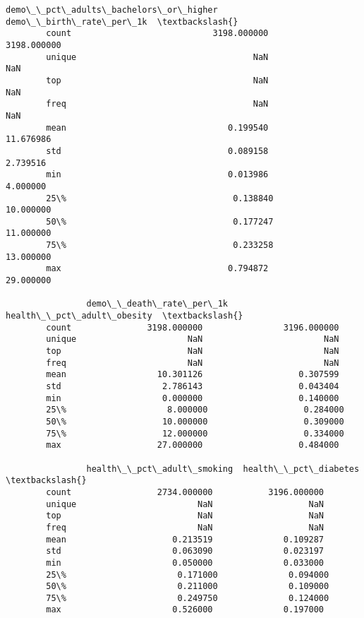 \documentclass[11pt]{article}
\begin{document}
\begin{Verbatim}[commandchars=\\\{\}]
                demo\_\_pct\_adults\_bachelors\_or\_higher  demo\_\_birth\_rate\_per\_1k  \textbackslash{}
        count                            3198.000000              3198.000000   
        unique                                   NaN                      NaN   
        top                                      NaN                      NaN   
        freq                                     NaN                      NaN   
        mean                                0.199540                11.676986   
        std                                 0.089158                 2.739516   
        min                                 0.013986                 4.000000   
        25\%                                 0.138840                10.000000   
        50\%                                 0.177247                11.000000   
        75\%                                 0.233258                13.000000   
        max                                 0.794872                29.000000   
        
                demo\_\_death\_rate\_per\_1k  health\_\_pct\_adult\_obesity  \textbackslash{}
        count               3198.000000                3196.000000   
        unique                      NaN                        NaN   
        top                         NaN                        NaN   
        freq                        NaN                        NaN   
        mean                  10.301126                   0.307599   
        std                    2.786143                   0.043404   
        min                    0.000000                   0.140000   
        25\%                    8.000000                   0.284000   
        50\%                   10.000000                   0.309000   
        75\%                   12.000000                   0.334000   
        max                   27.000000                   0.484000   
        
                health\_\_pct\_adult\_smoking  health\_\_pct\_diabetes  \textbackslash{}
        count                 2734.000000           3196.000000   
        unique                        NaN                   NaN   
        top                           NaN                   NaN   
        freq                          NaN                   NaN   
        mean                     0.213519              0.109287   
        std                      0.063090              0.023197   
        min                      0.050000              0.033000   
        25\%                      0.171000              0.094000   
        50\%                      0.211000              0.109000   
        75\%                      0.249750              0.124000   
        max                      0.526000              0.197000   
        

\end{Verbatim}
\end{document}
